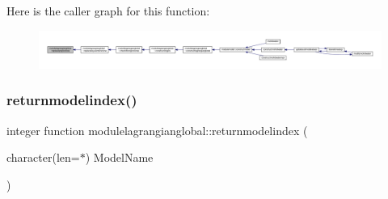 Here is the caller graph for this function\+:\nopagebreak
\begin{figure}[H]
\begin{center}
\leavevmode
\includegraphics[width=350pt]{namespacemodulelagrangianglobal_a203dd84eb4a1c9f6704c8a3af740be1b_icgraph}
\end{center}
\end{figure}
\mbox{\label{namespacemodulelagrangianglobal_a446618968d07df360f90a4ddc2d93a99}} 
\subsubsection{\texorpdfstring{returnmodelindex()}{returnmodelindex()}}
{\footnotesize\ttfamily integer function modulelagrangianglobal\+::returnmodelindex (\begin{DoxyParamCaption}\item[{character(len=$\ast$)}]{Model\+Name }\end{DoxyParamCaption})\hspace{0.3cm}{\ttfamily [private]}}

